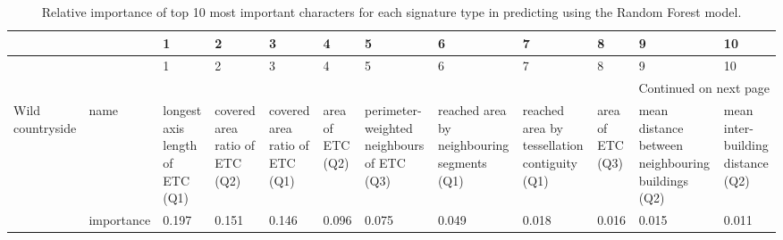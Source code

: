 \documentclass[fleqn,10pt]{wlscirep}
\begin{document}
\begin{longtable}{p{}p{}p{}p{}p{}p{}p{}p{}p{}p{}p{}p{}}
    \caption{\label{tab:imp_cls}Relative importance of top 10 most important characters for each signature type in
        predicting using the Random Forest model.}\\
    \toprule
                                &                 &                                                  1 &                                                  2 &                                                  3 &                                                  4 &                                                  5 &                                                  6 &                                                  7 &                                                  8 &                                                  9 &                                                  10 \\
    \midrule
    \endfirsthead
    \toprule
                                &                 &                                                  1 &                                                  2 &                                                  3 &                                                  4 &                                                  5 &                                                  6 &                                                  7 &                                                  8 &                                                  9 &                                                  10 \\
    \midrule
    \endhead
    \midrule
    \multicolumn{12}{r}{{Continued on next page}} \\
    \midrule
    \endfoot
    \bottomrule
    \endlastfoot
    Wild countryside & name &                    longest axis length of ETC (Q1) &                     covered area ratio of ETC (Q2) &                     covered area ratio of ETC (Q1) &                                   area of ETC (Q2) &          perimeter-weighted neighbours of ETC (Q3) &         reached area by neighbouring segments (Q1) &       reached area by tessellation contiguity (Q1) &                                   area of ETC (Q3) &  mean distance between neighbouring buildings (Q2) &                  mean inter-building distance (Q2) \\
                                & importance &                                              0.197 &                                              0.151 &                                              0.146 &                                              0.096 &                                              0.075 &                                              0.049 &                                              0.018 &                                              0.016 &                                              0.015 &                                              0.011 \\

\end{longtable}
\end{document}

